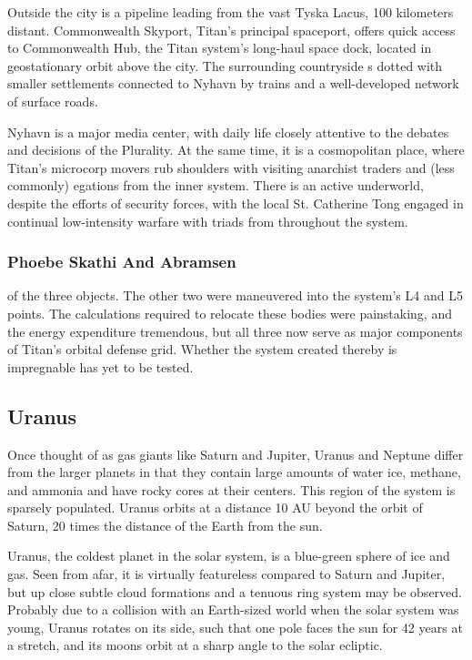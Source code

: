Outside the city is a pipeline  leading  from the 
vast Tyska Lacus, 100 kilometers distant. Commonwealth Skyport, Titan's principal spaceport, offers 
quick access to Commonwealth Hub, the Titan system's long-haul space dock, located in geostationary
orbit above the city. The surrounding countryside 
s  dotted  with smaller settlements connected  to
Nyhavn by trains and a well-developed network of 
surface roads.

Nyhavn is a major media center, with daily life 
closely attentive to the debates and decisions of 
the Plurality. At the same time, it is a cosmopolitan
place, where Titan's microcorp movers rub shoulders
with visiting anarchist traders and (less commonly) 
egations from the inner system. There is an active 
underworld,  despite the efforts of security  forces, 
with the local St. Catherine Tong engaged in continual low-intensity warfare with triads from throughout
the system.

\subsubsection{Phoebe Skathi And Abramsen}

of the three objects. The other two 
were maneuvered into the system's L4 
and L5 points. The calculations required 
to relocate these bodies were painstaking, and the energy expenditure tremendous, 
but all three now serve as major components of 
Titan's orbital defense grid. Whether the system created thereby is impregnable has yet to be tested.

\subsection{Uranus}

Once thought of as gas giants like Saturn and Jupiter, Uranus and Neptune differ from the larger 
planets in that they contain large amounts of water 
ice, methane, and ammonia and have rocky cores at 
their centers. This region of the system is sparsely 
populated. Uranus orbits at a distance 10 AU beyond 
the orbit of Saturn, 20 times the distance of the Earth 
from the sun.

Uranus, the coldest planet in the solar system, is a 
blue-green sphere of ice and gas. Seen from afar, it is 
virtually featureless compared to Saturn and Jupiter, 
but up close subtle cloud formations and a tenuous 
ring system may be observed. Probably due to a collision with an Earth-sized world when the solar system 
was young, Uranus rotates on its side, such that one 
pole faces the sun for 42 years at a stretch, and its 
moons orbit at a sharp angle to the solar ecliptic.

